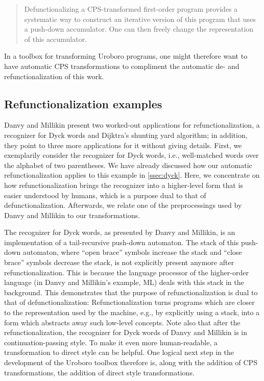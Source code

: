 \blockcquote[20]{danvy01defunctionalization}{Defunctionalizing a CPS-transformed first-order program provides a systematic way to construct an iterative version of this program that uses a push-down accumulator. One can then freely change the representation of this accumulator.}

In a toolbox for transforming Uroboro programs, one might therefore want to have automatic CPS transformations to compliment the automatic de- and refunctionalization of this work.

\subsection{Refunctionalization examples}
\label{ssec:refuncex}

Danvy and Millikin\cite{danvy09refunctionalization} present two worked-out applications for refunctionalization, a recognizer for Dyck words and Dijktra's shunting yard algorithm; in addition, they point to three more applications for it without giving details. First, we exemplarily consider the recognizer for Dyck words, i.e., well-matched words over the alphabet of two parentheses. We have already discussed how our automatic refunctionalization applies to this example in \autoref{ssec:dyck}. Here, we concentrate on how refunctionalization brings the recognizer into a higher-level form that is easier understood by humans, which is a purpose dual to that of defunctionalization. Afterwards, we relate one of the preprocessings used by Danvy and Millikin to our transformations.

The recognizer for Dyck words, as presented by Danvy and Millikin, is an implementation of a tail-recursive push-down automaton. The stack of this push-down automaton, where ``open brace'' symbols increase the stack and ``close brace'' symbols decrease the stack, is not explicitly present anymore after refunctionalization. This is because the language processor of the higher-order language (in Danvy and Millikin's example, ML) deals with this stack in the background. This demonstrates that the purpose of refunctionalization is dual to that of defunctionalization: Refunctionalization turns programs which are closer to the representation used by the machine, e.g., by explicitly using a stack, into a form which abstracts away such low-level concepts. Note also that after the refunctionalization, the recognizer for Dyck words of Danvy and Millikin is in continuation-passing style. To make it even more human-readable, a transformation to direct style can be helpful. One logical next step in the development of the Uroboro toolbox therefore is, along with the addition of CPS transformations, the addition of direct style transformations.

